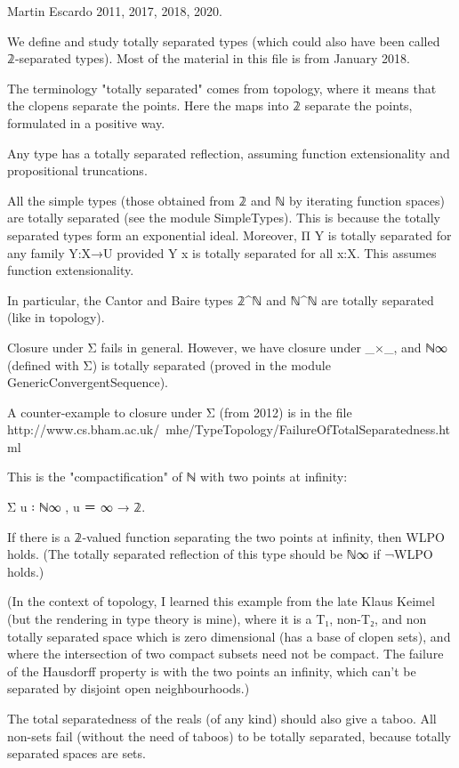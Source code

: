 Martin Escardo 2011, 2017, 2018, 2020.

We define and study totally separated types (which could also have
been called 𝟚-separated types). Most of the material in this file is
from January 2018.

The terminology "totally separated" comes from topology, where it
means that the clopens separate the points. Here the maps into 𝟚
separate the points, formulated in a positive way.

Any type has a totally separated reflection, assuming function
extensionality and propositional truncations.

All the simple types (those obtained from 𝟚 and ℕ by iterating
function spaces) are totally separated (see the module
SimpleTypes). This is because the totally separated types form an
exponential ideal. Moreover, Π Y is totally separated for any family
Y:X→U provided Y x is totally separated for all x:X. This assumes
function extensionality.

In particular, the Cantor and Baire types 𝟚^ℕ and ℕ^ℕ are totally
separated (like in topology).

Closure under Σ fails in general. However, we have closure under _×_,
and ℕ∞ (defined with Σ) is totally separated (proved in the module
GenericConvergentSequence).

A counter-example to closure under Σ (from 2012) is in the file
http://www.cs.bham.ac.uk/~mhe/TypeTopology/FailureOfTotalSeparatedness.html

This is the "compactification" of ℕ with two points at infinity:

   Σ u ꞉ ℕ∞ , u ＝ ∞ → 𝟚.

If there is a 𝟚-valued function separating the two points at infinity,
then WLPO holds. (The totally separated reflection of this type should
be ℕ∞ if ¬WLPO holds.)

(In the context of topology, I learned this example from the late
Klaus Keimel (but the rendering in type theory is mine), where it is a
T₁, non-T₂, and non totally separated space which is zero dimensional
(has a base of clopen sets), and where the intersection of two compact
subsets need not be compact. The failure of the Hausdorff property is
with the two points an infinity, which can't be separated by disjoint
open neighbourhoods.)

The total separatedness of the reals (of any kind) should also give a
taboo. All non-sets fail (without the need of taboos) to be totally
separated, because totally separated spaces are sets.

